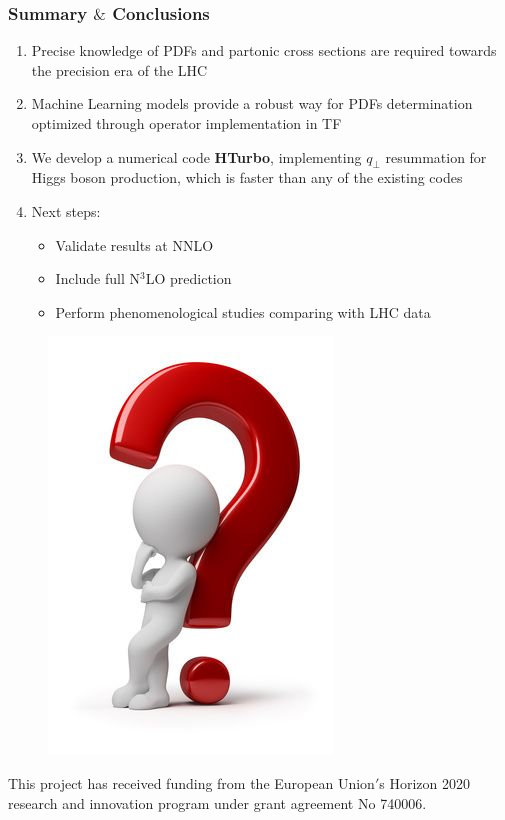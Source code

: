\documentclass[aspectratio=43]{beamer}
\begin{document}
\begin{frame}
	
	\frametitle{Summary $\&$ Conclusions}

	\vspace{2.0 cm}
	
	\begin{enumerate}
		\item \footnotesize Precise knowledge of PDFs and partonic cross sections are required towards the precision era of the LHC
		\item \footnotesize Machine Learning models provide a robust way for PDFs determination optimized through {\color{blue}operator implementation in TF}
		\item \footnotesize We develop a numerical code \textbf{HTurbo}, implementing $q_{\perp}$ resummation for Higgs boson production, which is {\color{blue} faster than any of the existing codes}
		\item \footnotesize Next steps: 
		\begin{itemize}
			\item \footnotesize Validate results at NNLO
			\item \footnotesize Include full {\color{blue}N$^{3}$LO} prediction
			\item \footnotesize Perform phenomenological studies comparing with LHC data
		\end{itemize}

	\end{enumerate}

	\vspace{2.0 cm}

\end{frame}

\begin{frame}


	\begin{figure}
		\includegraphics[width = 2.5 cm]{plots/thinking.png}
	\end{figure}		

	{\footnotesize \color{blue} This project has received funding from the European Union$'$s Horizon 2020 research and innovation program under grant agreement No 740006.}

\end{frame}
\end{document}
